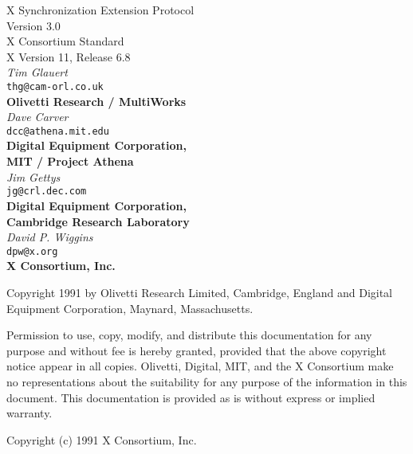 \begin{center}

{\large X Synchronization Extension Protocol}\\[10pt]
{\large Version 3.0}\\[15pt]
{\large X Consortium Standard}\\[15pt]
{\large X Version 11, Release 6.8}\\[15pt]
{\it Tim Glauert}\\[0pt]
{\tt thg@cam-orl.co.uk}\\[0pt]
{\bf Olivetti Research / MultiWorks}\\[5pt]
{\it Dave Carver}\\[0pt]
{\tt dcc@athena.mit.edu}\\[0pt]
{\bf Digital Equipment Corporation,}\\[0pt]
{\bf MIT / Project Athena}\\[5pt]
{\it Jim Gettys}\\[0pt]
{\tt jg@crl.dec.com}\\[0pt]
{\bf Digital Equipment Corporation,}\\[0pt]
{\bf Cambridge Research Laboratory}\\[5pt]
{\it David P. Wiggins}\\[0pt]
{\tt dpw@x.org}\\[0pt]
{\bf X Consortium, Inc.}\\[0pt]

\end {center}

Copyright 1991 by Olivetti Research Limited, Cambridge, England and
Digital Equipment Corporation, Maynard, Massachusetts.

{\small Permission to use, copy, modify, and distribute this documentation
for any purpose and without fee is hereby granted, provided that the above
copyright notice appear in all copies. Olivetti, Digital, MIT, and the
X Consortium
make no representations about the suitability for any purpose of the
information in this document. This documentation is provided as is without
express or implied warranty.}

Copyright (c) 1991 X Consortium, Inc.

